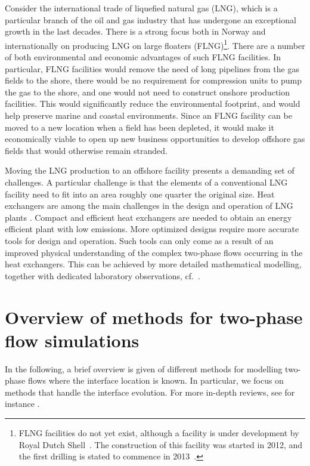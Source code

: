 \documentclass[11pt,b5paper,DIV=calc,BCOR1.3cm,headings=small,%
               footinclude=false,headsepline]{scrbook}
\begin{document}
Consider the international trade of liquefied natural gas (LNG), which is
a particular branch of the oil and gas industry that has undergone an
exceptional growth in the last decades.  There is a strong focus both in Norway
and internationally on producing LNG on large floaters
(FLNG)\footnote{FLNG facilities do not yet exist, although a facility is under
  development by Royal Dutch Shell~\cite{Prelude1}.  The construction of this
  facility was started in 2012, and the first drilling is stated to commence in
  2013~\cite{Prelude2}.}.  There are a number of both environmental and
economic advantages of such FLNG facilities.  In particular, FLNG facilities
would remove the need of long pipelines from the gas fields to the shore, there
would be no requirement for compression units to pump the gas to the shore, and
one would not need to construct onshore production facilities.  This would
significantly reduce the environmental footprint, and would help preserve
marine and coastal environments.  Since an FLNG facility can be moved to a new
location when a field has been depleted, it would make it economically viable
to open up new business opportunities to develop offshore gas fields that would
otherwise remain stranded.

Moving the LNG production to an offshore facility presents a demanding set of
challenges.  A particular challenge is that the elements of a conventional LNG
facility need to fit into an area roughly one quarter the original size.  Heat
exchangers are among the main challenges in the design and operation of LNG
plants \cite{Hesselgreaves01}.  Compact and efficient heat exchangers are
needed to obtain an energy efficient plant with low emissions.  More optimized
designs require more accurate tools for design and operation.  Such tools can
only come as a result of an improved physical understanding of the complex
two-phase flows occurring in the heat exchangers.  This can be achieved by more
detailed mathematical modelling, together with dedicated laboratory
observations, cf.\ \cite{Olsen07}.

\section{Overview of methods for two-phase flow simulations}
In the following, a brief overview is given of different methods for modelling
two-phase flows where the interface location is known.  In particular, we focus
on methods that handle the interface evolution.  For more in-depth reviews, see
for instance \cite{Cristini04,Scardovelli99,Sethian03}.
\end{document}
